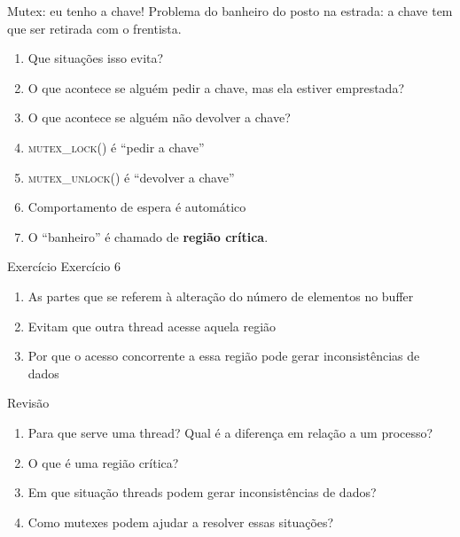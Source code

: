 \documentclass{beamer}
\begin{document}
\begin{frame}[fragile]{Mutex: eu tenho a chave!}
  \centering
  \Large
  Problema do banheiro do posto na estrada:
  a chave tem que ser retirada com o frentista.
  \begin{enumerate}
    \item Que situações isso evita?
    \item O que acontece se alguém pedir a chave, mas ela estiver emprestada?
    \item O que acontece se alguém não devolver a chave?
    \item <2->\textsc{mutex\_lock()} é ``pedir a chave''
    \item <2->\textsc{mutex\_unlock()} é ``devolver a chave''
    \item <2->Comportamento de espera é automático
    \item <2->O ``banheiro'' é chamado de \textbf{região crítica}.
  \end{enumerate}
\end{frame}

\begin{frame}[fragile]{Exercício}
  \centering
  \Large
  Exercício 6
  \begin{enumerate}
    \item <2-> As partes que se referem à alteração do número de elementos no
      buffer
    \item <3-> Evitam que outra thread acesse aquela região
    \item <4-> Por que o acesso concorrente a essa região pode gerar
      inconsistências de dados
  \end{enumerate}
\end{frame}


\begin{frame}[fragile]{Revisão}
  \centering
  \Large
  \begin{enumerate}
    \item Para que serve uma thread? Qual é a diferença em relação a um
      processo?
    \item O que é uma região crítica?
    \item Em que situação threads podem gerar inconsistências de dados?
    \item Como mutexes podem ajudar a resolver essas situações?
  \end{enumerate}
\end{frame}
\end{document}
